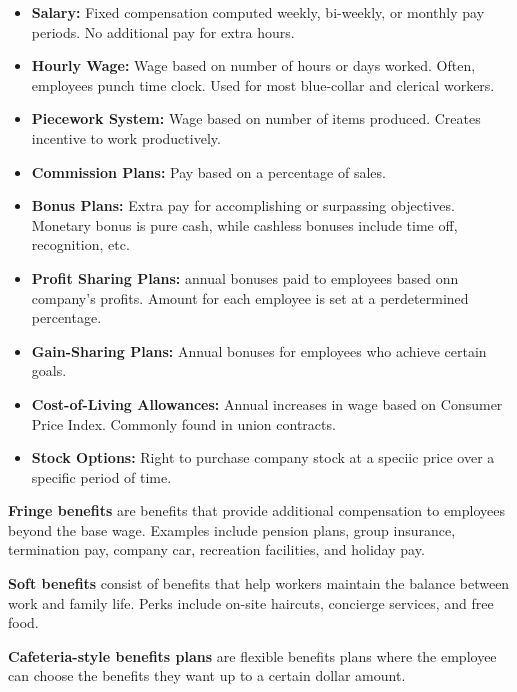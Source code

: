 \documentclass[english, 12pt]{article}
\begin{document}
\begin{itemize}
\item \textbf{Salary:} Fixed compensation computed weekly, bi-weekly, or monthly pay periods. No additional pay for extra hours.
\item \textbf{Hourly Wage:} Wage based on number of hours or days worked. Often, employees punch time clock. Used for most blue-collar and clerical workers.
\item \textbf{Piecework System:} Wage based on number of items produced. Creates incentive to work productively.
\item \textbf{Commission Plans:} Pay based on a percentage of sales.
\item \textbf{Bonus Plans:} Extra pay for accomplishing or surpassing objectives. Monetary bonus is pure cash, while cashless bonuses include time off, recognition, etc.
\item \textbf{Profit Sharing Plans:} annual bonuses paid to employees based onn company's profits. Amount for each employee is set at a perdetermined percentage.
\item \textbf{Gain-Sharing Plans:} Annual bonuses for employees who achieve certain goals.
\item \textbf{Cost-of-Living Allowances:} Annual increases in wage based on Consumer Price Index. Commonly found in union contracts.
\item \textbf{Stock Options:} Right to purchase company stock at a speciic price over a specific period of time.
\end{itemize}
\begin{defn}
\textbf{Fringe benefits} are benefits that provide additional compensation to employees beyond the base wage. Examples include pension plans, group insurance, termination pay, company car, recreation facilities, and holiday pay.
\end{defn}
\begin{defn}
\textbf{Soft benefits} consist of benefits that help workers maintain the balance between work and family life. Perks include on-site haircuts, concierge services, and free food.
\end{defn}
\begin{defn}
\textbf{Cafeteria-style benefits plans} are flexible benefits plans where the employee can choose the benefits they want up to a certain dollar amount.
\end{defn}
\end{document}
